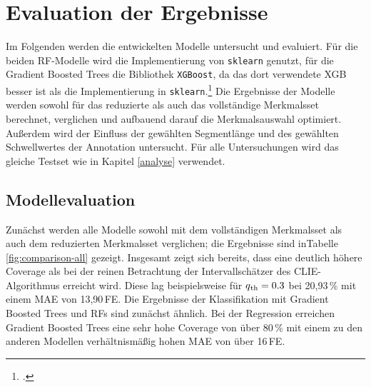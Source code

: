 \chapter{Evaluation der Ergebnisse}\label{evaluation}

Im Folgenden werden die entwickelten Modelle untersucht und evaluiert. Für die beiden \acl{RF}-Modelle wird die Implementierung von \texttt{sklearn} genutzt, für die Gradient Boosted Trees die Bibliothek \texttt{XGBoost}, da das dort verwendete \acl{XGB} besser ist als die Implementierung in \texttt{sklearn}.\footcite[Kapitel 10]{Harrison2019} Die Ergebnisse der Modelle werden sowohl für das reduzierte als auch das vollständige Merkmalsset berechnet, verglichen und aufbauend darauf die Merkmalsauswahl optimiert. Außerdem wird der Einfluss der gewählten Segmentlänge und des gewählten Schwellwertes der Annotation untersucht. Für alle Untersuchungen wird das gleiche Testset wie in Kapitel \ref{analyse} verwendet.

\section{Modellevaluation} %

Zunächst werden alle Modelle sowohl mit dem vollständigen Merkmalsset als auch dem reduzierten Merkmalsset verglichen; die Ergebnisse sind inTabelle \ref{fig:comparison-all} gezeigt. Insgesamt zeigt sich bereits, dass eine deutlich höhere Coverage als bei der reinen Betrachtung der Intervallschätzer des CLIE-Algorithmus erreicht wird. Diese lag beispielsweise für $q\textsubscript{th} = 0.3$ bei 20,93\,\% mit einem \ac{MAE} von 13,90\,\si{FE}. Die Ergebnisse der Klassifikation mit Gradient Boosted Trees und \acl{RF}s sind zunächst ähnlich. Bei der Regression erreichen Gradient Boosted Trees eine sehr hohe Coverage von über 80\,\% mit einem zu den anderen Modellen verhältnismäßig hohen \ac{MAE} von über 16\,\si{FE}.

